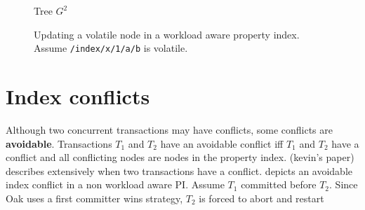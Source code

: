\documentclass[abstracton,12pt]{scrreprt}
\begin{document}
\begin{figure}[h]
\begin{scriptsize}
\begin{multicols}{3}
\begin{center}
                Tree $G^2$
            \end{center}
        \end{multicols}
    \end{scriptsize}
    \caption{Updating a volatile node in a workload aware property index. Assume \texttt{/index/x/1/a/b} is volatile.}
    \label{fig:update_wapi}
\end{figure}

\section{Index conflicts}

Although two concurrent transactions may have conflicts, some conflicts are \textbf{avoidable}.
Transactions $T_1$ and $T_2$ have an avoidable conflict iff $T_1$ and $T_2$ have a conflict and all conflicting nodes are nodes in the property index.
(kevin's paper) describes extensively when two transactions have a conflict.
 depicts an avoidable index conflict in a non workload aware PI.
Assume $T_1$ committed before $T_2$. Since Oak uses a first committer wins strategy, $T_2$ is forced to abort and restart
\end{document}
